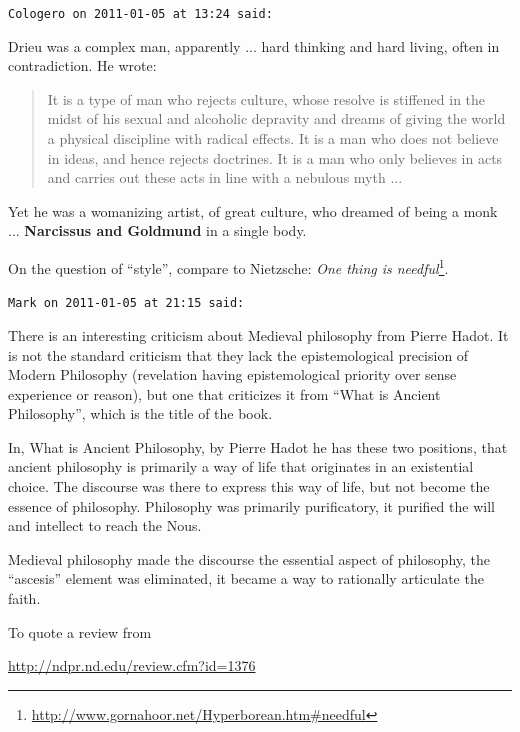 \begin{footnotesize}
\begin{sffamily}
\hfill

\texttt{Cologero on 2011-01-05 at 13:24 said:}

Drieu was a complex man, apparently ... hard thinking and hard living, often in contradiction. He wrote:

\begin{quote}
\footnotesize
It is a type of man who rejects culture, whose resolve is stiffened in the midst of his sexual and alcoholic depravity and dreams of giving the world a physical discipline with radical effects. It is a man who does not believe in ideas, and hence rejects doctrines. It is a man who only believes in acts and carries out these acts in line with a nebulous myth
... 
\end{quote}


Yet he was a womanizing artist, of great culture, who dreamed of being a monk ... \textbf{Narcissus and Goldmund} in a single body.

On the question of ``style'', compare to Nietzsche: \textit{One thing is needful}\footnote{\url{http://www.gornahoor.net/Hyperborean.htm\#needful}}.

\hfill

\texttt{Mark on 2011-01-05 at 21:15 said:}

There is an interesting criticism about Medieval philosophy from Pierre Hadot. It is not the standard criticism that they lack the epistemological precision of Modern Philosophy (revelation having epistemological priority over sense experience or reason), but one that criticizes it from ``What is Ancient Philosophy'', which is the title of the book.

In, What is Ancient Philosophy, by Pierre Hadot he has these two positions, that ancient philosophy is primarily a way of life that originates in an existential choice. The discourse was there to express this way of life, but not become the essence of philosophy. Philosophy was primarily purificatory, it purified the will and intellect to reach the Nous.

Medieval philosophy made the discourse the essential aspect of philosophy, the ``ascesis'' element was eliminated, it became a way to rationally articulate the faith.

To quote a review from

\url{http://ndpr.nd.edu/review.cfm?id=1376}



\end{sffamily}
\end{footnotesize}
